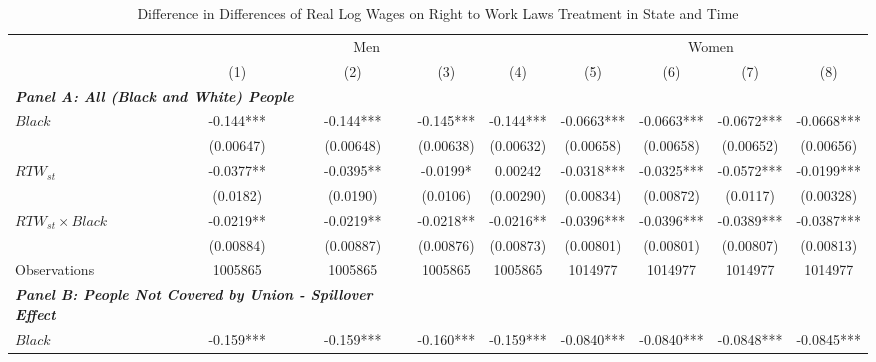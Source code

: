 \begin{table}[ht!]\centering
\def\sym#1{\ifmmode^{#1}\else\(^{#1}\)\fi}
\caption{Difference in Differences of Real Log Wages on Right to Work Laws Treatment in State and Time}\label{tab:wagstagdid}
\fontsize{10}{11}\selectfont
\begin{tabular}{l*{8}{c}}
\hline
&\multicolumn{4}{c}{Men}                                        &\multicolumn{4}{c}{Women}                                      \\\cmidrule(lr){2-5}\cmidrule(lr){6-9}
&\multicolumn{1}{c}{(1)}   &\multicolumn{1}{c}{(2)}   &\multicolumn{1}{c}{(3)}   &\multicolumn{1}{c}{(4)}   &\multicolumn{1}{c}{(5)}   &\multicolumn{1}{c}{(6)}   &\multicolumn{1}{c}{(7)}   &\multicolumn{1}{c}{(8)}   \\
\hline
\multicolumn{3}{l}{\linebreak \textbf{\textit{Panel A: All (Black and White) People}}} \\
$ Black $           &      -0.144***&      -0.144***&      -0.145***&      -0.144***&     -0.0663***&     -0.0663***&     -0.0672***&     -0.0668***\\
&   (0.00647)   &   (0.00648)   &   (0.00638)   &   (0.00632)   &   (0.00658)   &   (0.00658)   &   (0.00652)   &   (0.00656)   \\
[1em]
$ RTW_{st} $      &     -0.0377** &     -0.0395** &     -0.0199*  &     0.00242   &     -0.0318***&     -0.0325***&     -0.0572***&     -0.0199***\\
&    (0.0182)   &    (0.0190)   &    (0.0106)   &   (0.00290)   &   (0.00834)   &   (0.00872)   &    (0.0117)   &   (0.00328)   \\
[1em]
$ RTW_{st} \times Black $&     -0.0219** &     -0.0219** &     -0.0218** &     -0.0216** &     -0.0396***&     -0.0396***&     -0.0389***&     -0.0387***\\
&   (0.00884)   &   (0.00887)   &   (0.00876)   &   (0.00873)   &   (0.00801)   &   (0.00801)   &   (0.00807)   &   (0.00813)   \\
\hline
Observations        &     1005865   &     1005865   &     1005865   &     1005865   &     1014977   &     1014977   &     1014977   &     1014977   \\
\hline
\multicolumn{3}{l}{\linebreak \textbf{\textit{Panel B: People Not Covered by Union - Spillover Effect}}} \\
$ Black $           &      -0.159***&      -0.159***&      -0.160***&      -0.159***&     -0.0840***&     -0.0840***&     -0.0848***&     -0.0845***\\

\end{tabular}
\end{table}
